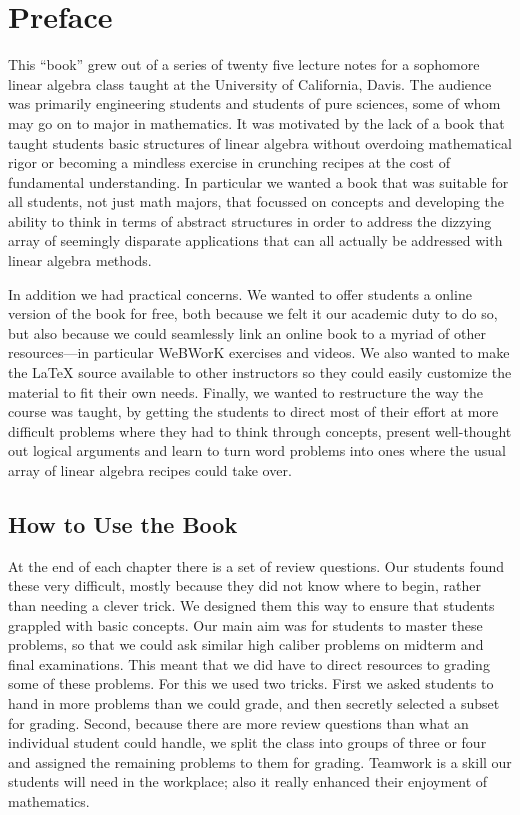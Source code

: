 
\section*{Preface}

This ``book'' grew out of a series of twenty five lecture notes for a sophomore linear algebra class
taught at the University of California, Davis. The audience was primarily engineering students and
students of pure sciences, some of whom may go on to major in mathematics.
It was motivated by the lack of a book that 
 taught students basic structures of linear algebra without overdoing mathematical rigor
 or becoming a mindless exercise in crunching recipes at the cost of fundamental understanding.
In particular we wanted a book that was suitable for all students, not just math majors, that focussed
on concepts and developing the ability to think in terms of abstract structures in order to address the 
dizzying array of seemingly disparate applications that can all actually be addressed with linear algebra methods.

In addition we had practical concerns. We wanted to offer students a online version of the book for free, both because
we felt it our academic duty to do so, but also because we could seamlessly link an online book to a myriad of other 
resources---in particular WeBWorK exercises and videos. We also wanted to make the LaTeX source available to other instructors
so they could easily customize the material to fit their own needs. Finally, we wanted to restructure the way the course 
was taught, by getting the students to direct most of their effort at more difficult problems where they had to think through
concepts,  present well-thought out logical arguments and learn to turn word problems into ones where the usual array of linear algebra recipes could take over.

\subsection*{How to Use the Book}

At the end of each chapter there is a set of review questions. Our students found these very difficult, mostly because they 
did not know where to begin, rather than needing a clever trick. We designed them this way to ensure that students grappled with 
basic concepts. Our main aim was for students to master these problems, so that we could ask similar high caliber problems on midterm and
final examinations. This meant that we did have to direct resources to grading some of these problems. For this we used two tricks.
First we asked students to hand in more problems than we could grade, and then secretly selected a subset for grading.
Second, because there are more review questions than what an individual student could handle, we split the class into groups of three
or four and assigned the remaining problems to them for grading. Teamwork is a skill our students will need in the workplace;
also it really enhanced their enjoyment of mathematics.

